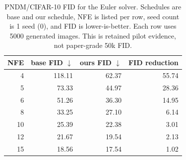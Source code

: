 \begin{table}[t]
  \centering
  \caption{PNDM/CIFAR-10 FID for the Euler solver. Schedules are
  base and our schedule, NFE is listed per row, seed count is 1 seed
  (0), and FID is lower-is-better. Each row uses 5000
  generated images. This is retained pilot evidence, not paper-grade 50k FID.}
  \label{tab:cifar10-pndm-euler-pilot-fid}
  \begin{tabular}{rrrr}
    \toprule
    NFE & base FID $\downarrow$ & ours FID $\downarrow$ & FID reduction \\
    \midrule
    4 & 118.11 & 62.37 & 55.74 \\
    5 & 73.33 & 44.97 & 28.36 \\
    6 & 51.26 & 36.30 & 14.95 \\
    8 & 33.25 & 27.10 & 6.14 \\
    10 & 25.39 & 22.38 & 3.01 \\
    12 & 21.67 & 19.54 & 2.13 \\
    15 & 18.56 & 17.54 & 1.02 \\
    \bottomrule
  \end{tabular}
\end{table}
